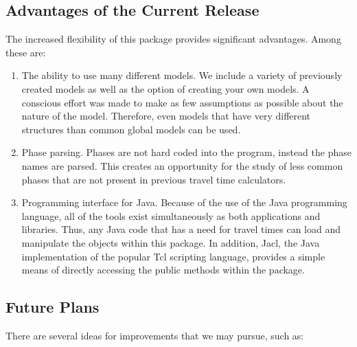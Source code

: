 \subsection{Advantages of the Current Release}
The increased flexibility of this package provides significant advantages. Among
these are:
\begin{enumerate}
\item The ability to use many different models. We include a variety of previously created
models as well as the option of creating your own models. A conscious effort
was made to make as few assumptions as possible about the nature of the model.
Therefore,
even models that have very different structures than common global models can be
used.

\item Phase parsing. Phases are not hard coded into the program, instead the phase
names are parsed. This creates an opportunity for the study of less common
phases that are not present in previous travel time calculators.

\item Programming interface for Java. Because of the use of the Java programming
language, all of the tools exist simultaneously as both applications and libraries.
Thus, any Java code that has a need for travel times can load and manipulate
the objects within this package. In addition, Jacl, the Java implementation of the popular Tcl scripting language, provides a simple means of directly accessing the public methods within the package.

\end{enumerate}


\subsection{Future Plans}

There are several ideas for improvements that we may pursue, such as:

